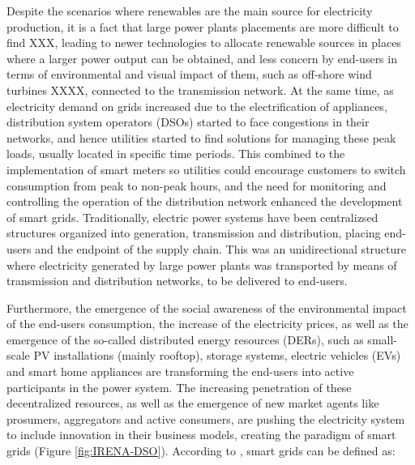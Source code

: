 Despite the scenarios where renewables are the main source for electricity production, it is a fact that large power plants placements are more difficult to find XXX, leading to newer technologies to allocate renewable sources in places where a larger power output can be obtained, and less concern by end-users in terms of environmental and visual impact of them, such as off-shore wind turbines XXXX, connected to the transmission network. At the same time, as electricity demand on grids increased due to the electrification of appliances, distribution system operators (DSOs) started to face congestions in their networks, and hence utilities started to find solutions for managing these peak loads, usually located in specific time periods.  This combined to the implementation of smart meters so utilities could encourage customers to switch consumption from peak to non-peak hours, and the need for monitoring and controlling the operation of the distribution network enhanced the development of smart grids. Traditionally, electric power systems have been centralizsed structures organized into generation, transmission and distribution, placing end-users and the endpoint of the supply chain. This was an unidirectional structure where electricity generated by large power plants was transported by means of transmission and distribution networks, to be delivered to end-users. 

Furthermore, the emergence of the social awareness of the environmental impact of the end-users consumption, the increase of the electricity prices, as well as the emergence of the so-called distributed energy resources (DERs), such as small-scale PV installations (mainly rooftop), storage systems, electric vehicles (EVs) and smart home appliances are transforming the end-users into active participants in the power system. The increasing penetration of these decentralized resources, as well as the emergence of new market agents like prosumers, aggregators and active consumers, are pushing the electricity system to include innovation in their business models, creating the paradigm of smart grids (Figure \ref{fig:IRENA-DSO}). According to \cite{EuropeanParliamentSG}, smart grids can be defined as:


